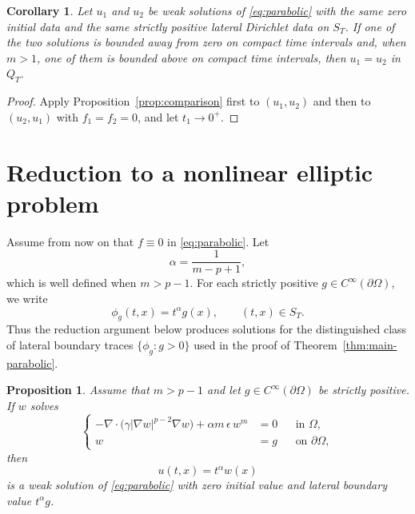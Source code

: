 \documentclass[a4paper,12pt]{article}
\newcommand{\pr}{\partial}
\newtheorem{prop}[thm]{Proposition}
\newtheorem{cor}[thm]{Corollary}
\theoremstyle{definition}
\theoremstyle{remark}
\begin{document}
\begin{cor}\label{cor:comparison-unique}
Let $u_1$ and $u_2$ be weak solutions of \eqref{eq:parabolic} with the same zero initial data and the same strictly positive lateral Dirichlet data on $S_T$. If one of the two solutions is bounded away from zero on compact time intervals and, when $m>1$, one of them is bounded above on compact time intervals, then $u_1=u_2$ in $Q_T$.
\end{cor}

\begin{proof}
Apply Proposition~\ref{prop:comparison} first to $(u_1,u_2)$ and then to $(u_2,u_1)$ with $f_1=f_2=0$, and let $t_1\to0^+$.
\end{proof}

\section{Reduction to a nonlinear elliptic problem}\label{sec:reduction}

Assume from now on that $f\equiv 0$ in \eqref{eq:parabolic}. Let
\begin{equation}\label{eq:alpha}
\alpha=\frac{1}{m-p+1},
\end{equation}
which is well defined when $m>p-1$. For each strictly positive $g\in C^\infty(\pr\Omega)$, we write
\begin{equation}\label{eq:separated-trace}
\phi_g(t,x)=t^\alpha g(x), \qquad (t,x)\in S_T.
\end{equation}
Thus the reduction argument below produces solutions for the distinguished class of lateral boundary traces $\{\phi_g:g>0\}$ used in the proof of Theorem~\ref{thm:main-parabolic}.

\begin{prop}\label{prop:separated}
Assume that $m>p-1$ and let $g\in C^\infty(\pr\Omega)$ be strictly positive. If $w$ solves
\begin{equation}\label{eq:elliptic-reduction}
\left\{
\begin{aligned}
-\nabla\cdot\bigl(\gamma|\nabla w|^{p-2}\nabla w\bigr)+\alpha m\,\epsilon\,w^m&=0 &&\text{in }\Omega,\\
 w&=g &&\text{on }\pr\Omega,
\end{aligned}
\right.
\end{equation}
then
\[
u(t,x)=t^\alpha w(x)
\]
is a weak solution of \eqref{eq:parabolic} with zero initial value and lateral boundary value $t^\alpha g$.
\end{prop}
\end{document}
